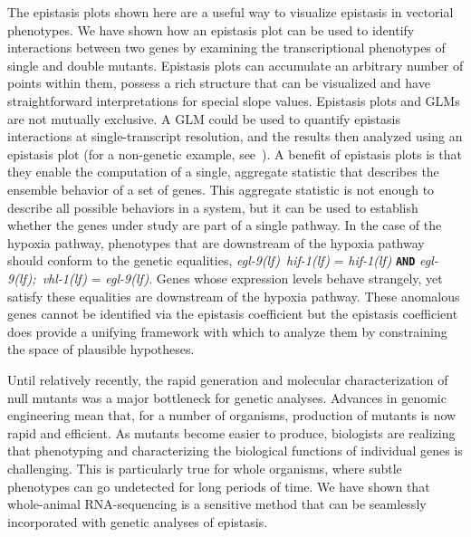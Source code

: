 \documentclass[9pt,twocolumn,twoside]{pnas-new}
\newcommand{\gene}[1]{\mbox{\emph{#1}}}
\newcommand{\egl}{\gene{egl-9(lf)}}
\newcommand{\eglvhl}{\gene{egl-9(lf); vhl-1(lf)}}
\newcommand{\eglhif}{\gene{egl-9(lf) hif-1(lf)}}
\newcommand{\hif}{\gene{hif-1(lf)}}
\begin{document}
The epistasis plots shown here are a useful way to visualize epistasis in
vectorial phenotypes. We have shown how an epistasis plot can be used to
identify interactions between two genes by examining the transcriptional
phenotypes of single and double mutants.
Epistasis plots can accumulate an
arbitrary number of points within them, possess a rich structure that can be
visualized and have straightforward interpretations for special slope values.
\color{purple}
Epistasis plots and GLMs are not mutually exclusive. A GLM could be used to
quantify epistasis interactions at single-transcript resolution, and the results
then analyzed using an epistasis plot (for a non-genetic example,
see~\cite{Angeles-Albores2017a}).
A benefit of epistasis
plots is that they enable the computation of a single, aggregate statistic that
describes the ensemble behavior of a set of genes. This aggregate statistic
is not enough to describe all possible behaviors in a system, but it can be used
to establish whether the genes under study are part of a single pathway. In the
case of the hypoxia pathway, phenotypes that are downstream of the hypoxia
pathway should conform to the genetic equalities, \eglhif{} = \hif{}
\textbf{\texttt{AND}} \eglvhl{} = \egl{}. Genes whose expression levels behave
strangely, yet satisfy these equalities are downstream of the hypoxia pathway.
These anomalous genes cannot be identified via the epistasis coefficient but the
epistasis coefficient does provide a unifying framework with which to analyze
them by constraining the space of plausible hypotheses.
\color{black}

Until relatively recently, the rapid generation and molecular characterization
of null mutants was a major bottleneck for genetic analyses. Advances in
genomic engineering mean that, for a number of organisms, production of mutants
is now rapid and efficient. As mutants become easier to produce, biologists are
realizing that phenotyping and characterizing the biological functions of
individual genes is challenging. This is particularly true for whole organisms,
where subtle phenotypes can go undetected for long periods of time. We have
shown that whole-animal RNA-sequencing is a sensitive method that can be
seamlessly incorporated with genetic analyses of epistasis.
\end{document}
